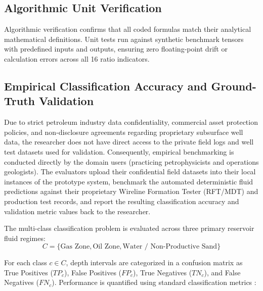 \subsection{Algorithmic Unit Verification}
Algorithmic verification confirms that all coded formulas match their analytical mathematical definitions. Unit tests run against synthetic benchmark tensors with predefined inputs and outputs, ensuring zero floating-point drift or calculation errors across all 16 ratio indicators.

\subsection{Empirical Classification Accuracy and Ground-Truth Validation}
Due to strict petroleum industry data confidentiality, commercial asset protection policies, and non-disclosure agreements regarding proprietary subsurface well data, the researcher does not have direct access to the private field logs and well test datasets used for validation. Consequently, empirical benchmarking is conducted directly by the domain users (practicing petrophysicists and operations geologists). The evaluators upload their confidential field datasets into their local instances of the prototype system, benchmark the automated deterministic fluid predictions against their proprietary Wireline Formation Tester (RFT/MDT) and production test records, and report the resulting classification accuracy and validation metric values back to the researcher.

The multi-class classification problem is evaluated across three primary reservoir fluid regimes:
\begin{equation}
    C = \{\text{Gas Zone}, \text{Oil Zone}, \text{Water / Non-Productive Sand}\}
\end{equation}

For each class $c \in C$, depth intervals are categorized in a confusion matrix as True Positives ($TP_c$), False Positives ($FP_c$), True Negatives ($TN_c$), and False Negatives ($FN_c$). Performance is quantified using standard classification metrics \citep{sokolova2009, powers2011}:


